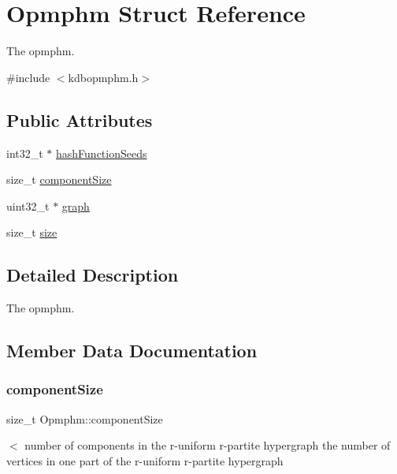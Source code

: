 \hypertarget{structOpmphm}{}\section{Opmphm Struct Reference}
\label{structOpmphm}


The opmphm.  




{\ttfamily \#include $<$kdbopmphm.\+h$>$}

\subsection*{Public Attributes}
\begin{DoxyCompactItemize}
\item 
int32\+\_\+t $\ast$ \hyperlink{structOpmphm_a522b3ab16ceb22828b54333868c9324d}{hash\+Function\+Seeds}
\item 
size\+\_\+t \hyperlink{structOpmphm_a01441fc04bd56fd6253ca4265364d39c}{component\+Size}
\item 
uint32\+\_\+t $\ast$ \hyperlink{structOpmphm_a9346a5fabe0c3a96abd70bb18cbd7fa2}{graph}
\item 
size\+\_\+t \hyperlink{structOpmphm_a72e7343b4ea87b27891e760f03fd2b96}{size}
\end{DoxyCompactItemize}


\subsection{Detailed Description}
The opmphm. 

\subsection{Member Data Documentation}
\mbox{\label{structOpmphm_a01441fc04bd56fd6253ca4265364d39c}} 
\subsubsection{\texorpdfstring{component\+Size}{componentSize}}
{\footnotesize\ttfamily size\+\_\+t Opmphm\+::component\+Size}

$<$ number of components in the r-\/uniform r-\/partite hypergraph the number of vertices in one part of the r-\/uniform r-\/partite hypergraph \mbox{\label{structOpmphm_a9346a5fabe0c3a96abd70bb18cbd7fa2}} 
